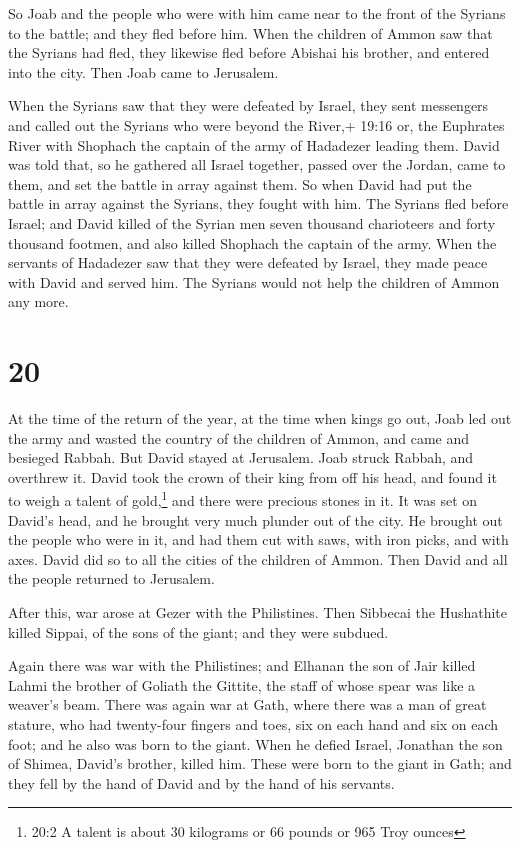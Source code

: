  So Joab and the people who were with him came near to the
front of the Syrians to the battle; and they fled before him.
 When the children of Ammon saw that the Syrians had fled,
they likewise fled before Abishai his brother, and entered into the
city. Then Joab came to Jerusalem.

 When the Syrians saw that they were defeated by Israel,
they sent messengers and called out the Syrians who were beyond the
River,+ 19:16 or, the Euphrates River with Shophach the captain of the
army of Hadadezer leading them.  David was told that, so he
gathered all Israel together, passed over the Jordan, came to them, and
set the battle in array against them. So when David had put the battle
in array against the Syrians, they fought with him.  The
Syrians fled before Israel; and David killed of the Syrian men seven
thousand charioteers and forty thousand footmen, and also killed
Shophach the captain of the army.  When the servants of
Hadadezer saw that they were defeated by Israel, they made peace with
David and served him. The Syrians would not help the children of Ammon
any more.

\hypertarget{section-19}{%
\section{20}\label{section-19}}

 At the time of the return of the year, at the time when
kings go out, Joab led out the army and wasted the country of the
children of Ammon, and came and besieged Rabbah. But David stayed at
Jerusalem. Joab struck Rabbah, and overthrew it.  David took
the crown of their king from off his head, and found it to weigh a
talent of gold,\footnote{20:2 A talent is about 30 kilograms or 66
  pounds or 965 Troy ounces} and there were precious stones in it. It
was set on David's head, and he brought very much plunder out of the
city.  He brought out the people who were in it, and had
them cut with saws, with iron picks, and with axes. David did so to all
the cities of the children of Ammon. Then David and all the people
returned to Jerusalem.

 After this, war arose at Gezer with the Philistines. Then
Sibbecai the Hushathite killed Sippai, of the sons of the giant; and
they were subdued.

 Again there was war with the Philistines; and Elhanan the
son of Jair killed Lahmi the brother of Goliath the Gittite, the staff
of whose spear was like a weaver's beam.  There was again
war at Gath, where there was a man of great stature, who had twenty-four
fingers and toes, six on each hand and six on each foot; and he also was
born to the giant.  When he defied Israel, Jonathan the son
of Shimea, David's brother, killed him.  These were born to
the giant in Gath; and they fell by the hand of David and by the hand of
his servants.

